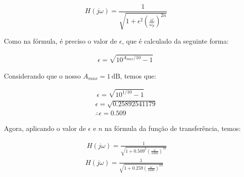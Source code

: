 $$
    H(j\omega) = \frac{1}{\sqrt{1+\epsilon^2 \left( \frac{\omega}{\omega_p} \right)^{2n}}}
$$

Como na fórmula, é preciso o valor de $\epsilon$, que é calculado da seguinte forma:

\begin{align} \
    \epsilon = \sqrt{10^{A_{max}/10}-1} \
    \label{eq:butterworth_epsilon_calculation} \
\end{align}

Considerando que o nosso $A_{max}=1\, \text{dB}$, temos que:

\begin{align*} \
    \epsilon = \sqrt{10^{1/10}-1}   \\
    \epsilon = \sqrt{0.25892541179} \\
    \therefore \epsilon = 0.509
\end{align*}

Agora, aplicando o valor de $\epsilon$ e $n$ na fórmula da função de transferência, temos:

\begin{align} \
    H(j\omega) = \frac{1}{\sqrt{1 + 0.509^2 \left( \frac{\omega}{1000} \right)^{10}}} \\
    H(j\omega) = \frac{1}{\sqrt{1 + 0.259 \left( \frac{\omega}{1000} \right)^{10}}}
\end{align}
